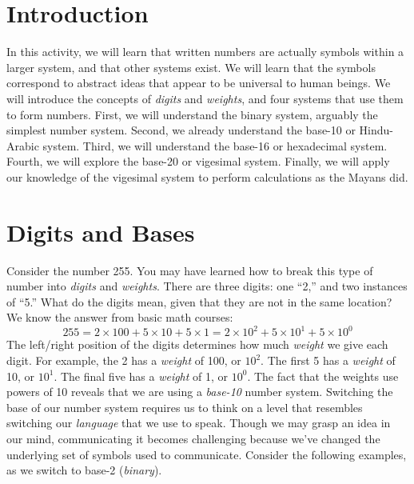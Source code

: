 \documentclass[12pt]{article}
\begin{document}
\maketitle

\section{Introduction}

In this activity, we will learn that written numbers are actually symbols within a larger system, and that other systems exist.  We will learn that the symbols correspond to abstract ideas that appear to be universal to human beings.  We will introduce the concepts of \textit{digits} and \textit{weights}, and four systems that use them to form numbers.  First, we will understand the binary system, arguably the simplest number system.  Second, we already understand the base-10 or Hindu-Arabic system.  Third, we will understand the base-16 or hexadecimal system.  Fourth, we will explore the base-20 or vigesimal system.  Finally, we will apply our knowledge of the vigesimal system to perform calculations as the Mayans did.

\section{Digits and Bases}

Consider the number 255.  You may have learned how to break this type of number into \textit{digits} and \textit{weights}.  There are three digits: one ``2,'' and two instances of ``5.''  What do the digits mean, given that they are not in the same location?  We know the answer from basic math courses:
\begin{equation}
255 = 2\times 100 + 5\times 10 + 5\times 1 = 2\times 10^2 + 5\times 10^1 + 5\times 10^0
\end{equation}
The left/right position of the digits determines how much \textit{weight} we give each digit.  For example, the 2 has a \textit{weight} of 100, or $10^2$.  The first 5 has a \textit{weight} of 10, or $10^1$.  The final five has a \textit{weight} of 1, or $10^0$.  The fact that the weights use powers of 10 reveals that we are using a \textit{base-10} number system.  Switching the base of our number system requires us to think on a level that resembles switching our \textit{language} that we use to speak.  Though we may grasp an idea in our mind, communicating it becomes challenging because we've changed the underlying set of symbols used to communicate.  Consider the following examples, as we switch to base-2 (\textit{binary}).
\end{document}
